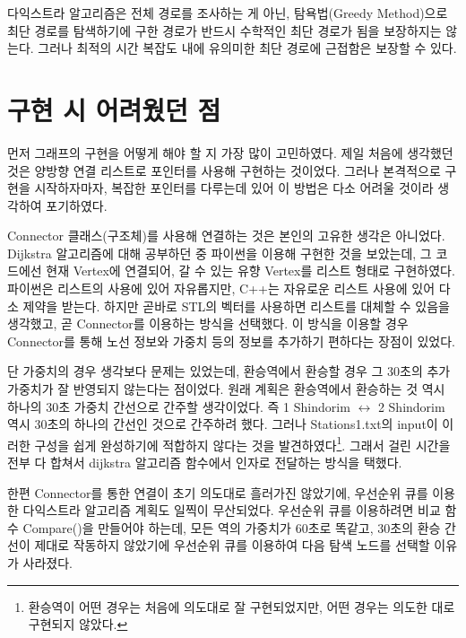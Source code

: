\documentclass{article}
\begin{document}
다익스트라 알고리즘은 전체 경로를 조사하는 게 아닌, 탐욕법(Greedy Method)으로 최단 경로를 탐색하기에 구한 경로가 반드시 수학적인 최단 경로가 됨을 보장하지는 않는다. 그러나 최적의 시간 복잡도 내에 유의미한 최단 경로에 근접함은 보장할 수 있다.

\section{구현 시 어려웠던 점}
먼저 그래프의 구현을 어떻게 해야 할 지 가장 많이 고민하였다. 제일 처음에 생각했던 것은 양방향 연결 리스트로 포인터를 사용해 구현하는 것이었다. 그러나 본격적으로 구현을 시작하자마자, 복잡한 포인터를 다루는데 있어 이 방법은 다소 어려울 것이라 생각하여 포기하였다.

Connector 클래스(구조체)를 사용해 연결하는 것은 본인의 고유한 생각은 아니었다. Dijkstra 알고리즘에 대해 공부하던 중 파이썬을 이용해 구현한 것을 보았는데, 그 코드에선 현재 Vertex에 연결되어, 갈 수 있는 유향 Vertex를 리스트 형태로 구현하였다. 파이썬은 리스트의 사용에 있어 자유롭지만, C++는 자유로운 리스트 사용에 있어 다소 제약을 받는다. 하지만 곧바로 STL의 벡터를 사용하면 리스트를 대체할 수 있음을 생각했고, 곧 Connector를 이용하는 방식을 선택했다. 이 방식을 이용할 경우 Connector를 통해 노선 정보와 가중치 등의 정보를 추가하기 편하다는 장점이 있었다.

단 가중치의 경우 생각보다 문제는 있었는데, 환승역에서 환승할 경우 그 30초의 추가 가중치가 잘 반영되지 않는다는 점이었다. 원래 계획은 환승역에서 환승하는 것 역시 하나의 30초 가중치 간선으로 간주할 생각이었다. 즉 1 Shindorim $\longleftrightarrow$ 2 Shindorim 역시 30초의 하나의 간선인 것으로 간주하려 했다. 그러나 Stations1.txt의 input이 이러한 구성을 쉽게 완성하기에 적합하지 않다는 것을 발견하였다\footnote{환승역이 어떤 경우는 처음에 의도대로 잘 구현되었지만, 어떤 경우는 의도한 대로 구현되지 않았다.}. 그래서 걸린 시간을 전부 다 합쳐서 dijkstra 알고리즘 함수에서 인자로 전달하는 방식을 택했다.

한편 Connector를 통한 연결이 초기 의도대로 흘러가진 않았기에, 우선순위 큐를 이용한 다익스트라 알고리즘 계획도 일찍이 무산되었다. 우선순위 큐를 이용하려면 비교 함수 Compare()을 만들어야 하는데, 모든 역의 가중치가 60초로 똑같고, 30초의 환승 간선이 제대로 작동하지 않았기에 우선순위 큐를 이용하여 다음 탐색 노드를 선택할 이유가 사라졌다.
\end{document}
